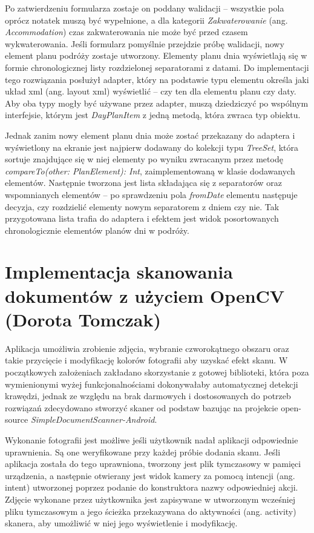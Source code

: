 \documentclass[10pt,twoside,a4paper]{report}
\begin{document}
\par Po zatwierdzeniu formularza zostaje on poddany walidacji – wszystkie pola oprócz notatek muszą być wypełnione, a dla kategorii \textit{Zakwaterowanie} (ang. \textit{Accommodation}) czas zakwaterowania nie może być przed czasem wykwaterowania. Jeśli formularz pomyślnie przejdzie próbę walidacji, nowy element planu podróży zostaje utworzony.
Elementy planu dnia wyświetlają się w formie chronologicznej listy rozdzielonej separatorami z datami. Do implementacji tego rozwiązania posłużył adapter, który na podstawie typu elementu określa jaki układ xml (ang. layout xml) wyświetlić – czy ten dla elementu planu czy daty. Aby oba typy mogły być używane przez adapter, muszą dziedziczyć po wspólnym interfejsie, którym jest \textit{DayPlanItem} z jedną metodą, która zwraca typ obiektu.
\par Jednak zanim nowy element planu dnia może zostać przekazany do adaptera i wyświetlony na ekranie jest najpierw dodawany do kolekcji typu \textit{TreeSet}, która sortuje znajdujące się w niej elementy po wyniku zwracanym przez metodę \textit{compareTo(other: PlanElement): Int}, zaimplementowaną w klasie dodawanych elementów. Następnie tworzona jest lista składająca się z separatorów oraz wspomnianych elementów – po sprawdzeniu pola \textit{fromDate} elementu następuje decyzja, czy rozdzielić elementy nowym separatorem z dniem czy nie. Tak przygotowana lista trafia do adaptera i efektem jest widok posortowanych chronologicznie elementów planów dni w podróży.


\section{Implementacja skanowania dokumentów z użyciem OpenCV (Dorota Tomczak)}
\par Aplikacja umożliwia zrobienie zdjęcia, wybranie czworokątnego obszaru oraz takie przycięcie i modyfikację kolorów fotografii aby uzyskać efekt skanu. W początkowych założeniach zakładano skorzystanie z gotowej biblioteki, która poza wymienionymi wyżej funkcjonalnościami dokonywałaby automatycznej detekcji krawędzi, jednak ze względu na brak darmowych i dostosowanych do potrzeb rozwiązań zdecydowano stworzyć skaner od podstaw bazując na projekcie open-source \textit{SimpleDocumentScanner-Android}\cite{SimpleDocumentScanner-Android}.

\par Wykonanie fotografii jest możliwe jeśli użytkownik nadał aplikacji odpowiednie uprawnienia. Są one weryfikowane przy każdej próbie dodania skanu. Jeśli aplikacja została do tego uprawniona, tworzony jest plik tymczasowy w pamięci urządzenia, a następnie otwierany jest widok kamery za pomocą intencji (ang. intent) utworzonej poprzez podanie do konstruktora nazwy odpowiedniej akcji. Zdjęcie wykonane przez użytkownika jest zapisywane w utworzonym wcześniej pliku tymczasowym a jego ścieżka przekazywana do aktywności (ang. activity) skanera, aby umożliwić w niej jego wyświetlenie i modyfikację.
\end{document}
